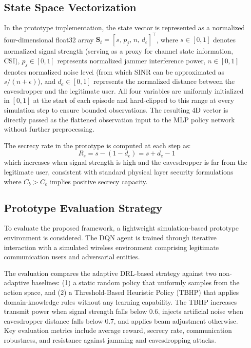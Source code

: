 \documentclass[conference]{IEEEtran}
\begin{document}
\subsection{State Space Vectorization}

In the prototype implementation, the state vector is represented as a normalized four-dimensional float32 array $\mathbf{S}_t = [s,\, p_j,\, n,\, d_e]^{\top}$, where $s \in [0,1]$ denotes normalized signal strength (serving as a proxy for channel state information, CSI), $p_j \in [0,1]$ represents normalized jammer interference power, $n \in [0,1]$ denotes normalized noise level (from which SINR can be approximated as $s/(n + \epsilon)$), and $d_e \in [0,1]$ represents the normalized distance between the eavesdropper and the legitimate user. All four variables are uniformly initialized in $[0,1]$ at the start of each episode and hard-clipped to this range at every simulation step to ensure bounded observations. The resulting 4D vector is directly passed as the flattened observation input to the MLP policy network without further preprocessing.

The secrecy rate in the prototype is computed at each step as:
\begin{equation}
R_s = s - (1 - d_e) = s + d_e - 1
\end{equation}
which increases when signal strength is high and the eavesdropper is far from the legitimate user, consistent with standard physical layer security formulations where $C_b > C_e$ implies positive secrecy capacity.

\subsection{Prototype Evaluation Strategy}

To evaluate the proposed framework, a lightweight simulation-based prototype environment is considered. The DQN agent is trained through iterative interaction with a simulated wireless environment comprising legitimate communication users and adversarial entities.

The evaluation compares the adaptive DRL-based strategy against two non-adaptive baselines: (1) a static random policy that uniformly samples from the action space, and (2) a Threshold-Based Heuristic Policy (TBHP) that applies domain-knowledge rules without any learning capability. The TBHP increases transmit power when signal strength falls below 0.6, injects artificial noise when eavesdropper distance falls below 0.7, and applies beam adjustment otherwise. Key evaluation metrics include average reward, secrecy rate, communication robustness, and resistance against jamming and eavesdropping attacks.
\end{document}
